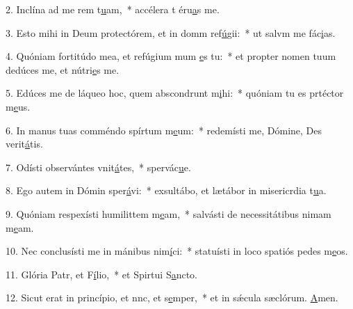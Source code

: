 2. Inclína ad me rem t\uline{u}am,~* accélera t éru\uline{a}s me.\par 
3. Esto mihi in Deum protectórem, et in domm ref\uline{ú}gii:~* ut salvm me fác\uline{i}as.\par 
4. Quóniam fortitúdo mea, et refúgium mum \uline{e}s tu:~* et propter nomen tuum dedúces me, et nútri\uline{e}s me.\par 
5. Edúces me de láqueo hoc, quem abscondrunt m\uline{i}hi:~* quóniam tu es prtéctor m\uline{e}us.\par 
6. In manus tuas comméndo spírtum m\uline{e}um:~* redemísti me, Dómine, Des verit\uline{á}tis.\par 
7. Odísti observántes vnit\uline{á}tes,~* spervác\uline{u}e.\par 
8. Ego autem in Dómin sper\uline{á}vi:~* exsultábo, et lætábor in misericrdia t\uline{u}a.\par 
9. Quóniam respexísti humilittem m\uline{e}am,~* salvásti de necessitátibus nimam m\uline{e}am.\par 
10. Nec conclusísti me in mánibus nim\uline{í}ci:~* statuísti in loco spatiós pedes m\uline{e}os.\par 
11. Glória Patr, et F\uline{í}lio,~* et Spirtui S\uline{a}ncto.\par 
12. Sicut erat in princípio, et nnc, et s\uline{e}mper,~* et in sǽcula sæclórum. \uline{A}men.\par 
